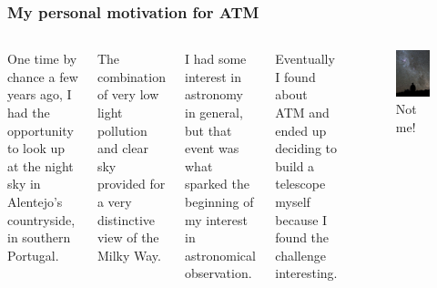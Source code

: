 \documentclass{beamer}
\begin{document}
\begin{frame}
\frametitle{My personal motivation for ATM}
\begin{columns}
One time by chance a few years ago, I had the opportunity to look up at the night sky in Alentejo's countryside, in southern Portugal.

The combination of very low light pollution and clear sky provided for a very distinctive view of the Milky Way.

I had some interest in astronomy in general, but that event was what sparked the beginning of my interest in astronomical observation.

Eventually I found about ATM and ended up deciding to build a telescope myself because I found the challenge interesting.
\begin{figure}
\includegraphics[scale=0.45]{assets/800px-Starry_Night_at_La_Silla.jpg}
\caption{Not me!}
\end{figure}
\end{columns}
\end{frame}
\end{document}
